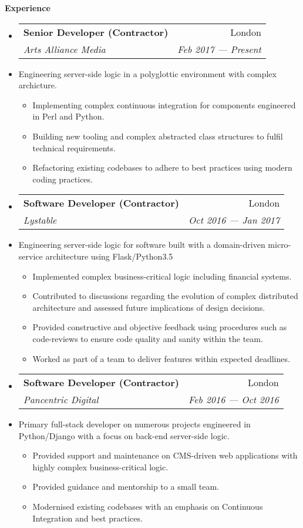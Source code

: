 \documentclass[letterpaper,11pt]{article}
\makeatletter
\newcommand{\resitem}[1]{\item #1 \vspace{-2pt}}
\newcommand{\resheading}[1]{{\large \colorbox{mygrey}
			{\begin{minipage}{\textwidth}
					{\textbf{#1 \vphantom{p\^{E}}}}
		\end{minipage}}}
	}
\newcommand{\ressubheading}[4]{
		\begin{tabular*}{180mm}{l@{\extracolsep{\fill}}r}
			\textbf{#1} & #2 \\
			\textit{#3} & \textit{#4} \\
		\end{tabular*}\vspace{-6pt}
	}
\newcommand{\resdescription}[1]{#1 \vspace{-0mm}}
\makeatother
\begin{document}
	\resheading{Experience}
	\begin{itemize}

		\item[]
            \ressubheading{Senior Developer (Contractor)}{London}{Arts Alliance Media}{Feb 2017 --- Present}
		\item[]
			\resdescription{Engineering server-side logic in a polyglottic environment with complex archicture.}
			\begin{itemize}
                    \resitem{Implementing complex continuous integration for components engineered in Perl and Python.}
                    \resitem{Building new tooling and complex abstracted class structures to fulfil technical requirements.}
                    \resitem{Refactoring existing codebases to adhere to best practices using modern coding practices.}
			\end{itemize}
		\item[]
            \ressubheading{Software Developer (Contractor)}{London}{Lystable}{Oct 2016 --- Jan 2017}
		\item[]
			\resdescription{Engineering server-side logic for software built with a domain-driven micro-service architecture using Flask/Python3.5}
			\begin{itemize}
                    \resitem{Implemented complex business-critical logic including financial systems.}
					\resitem{Contributed to discussions regarding the evolution of complex distributed architecture and assessed future implications of design decisions.}
                    \resitem{Provided constructive and objective feedback using procedures such as code-reviews to ensure code quality and sanity within the team.}
					\resitem{Worked as part of a team to deliver features within expected deadlines.}
			\end{itemize}
		\item[]
            \ressubheading{Software Developer (Contractor)}{London}{Pancentric Digital}{Feb 2016 --- Oct 2016}
		\item[]
			\resdescription{Primary full-stack developer on numerous projects engineered in Python/Django with a focus on back-end server-side logic.}
			\begin{itemize}
                    \resitem{Provided support and maintenance on CMS-driven web applications with highly complex business-critical logic.}
					\resitem{Provided guidance and mentorship to a small team.}
                    \resitem{Modernised existing codebases with an emphasis on Continuous Integration and best practices.}

\end{itemize}
\end{itemize}
\end{document}
